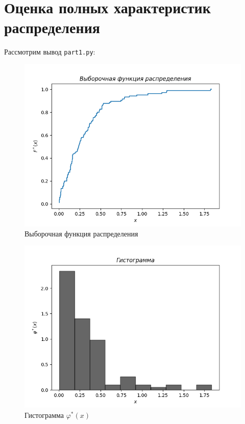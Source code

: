 \documentclass[a4paper,12pt]{article}
\begin{document}
    

    \section{Оценка полных характеристик распределения}
    Рассмотрим вывод \texttt{part1.py}:
    \begin{figure}[H]
        \centering
        \includegraphics[width=0.7\linewidth]{polytech/stats/homework-2/subfiles/fig/1}
        \caption{Выборочная функция распределения}
    \end{figure}
    \begin{figure}[H]
        \centering
        \includegraphics[width=0.7\linewidth]{polytech/stats/homework-2/subfiles/fig/2}
        \caption{Гистограмма $\varphi^*(x)$}
    \end{figure}
\end{document}
